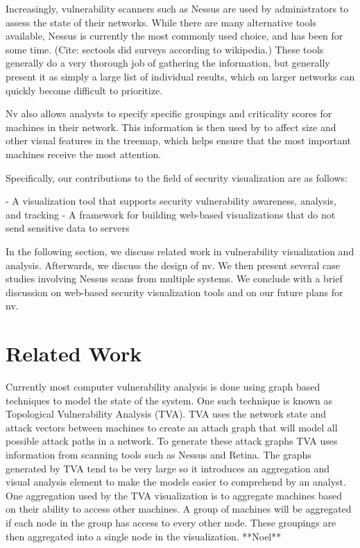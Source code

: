 \documentclass{acm_proc_article-sp}
\begin{document}
Increasingly, vulnerability scanners such as Nessus are used by administrators to assess the state of their networks.  While there are many alternative tools available, Nessus is currently the most commonly used choice, and has been for some time. (Cite: sectools did surveys according to wikipedia.)  These tools generally do a very thorough job of gathering the information, but generally present it as simply a large list of individual results, which on larger networks can quickly become difficult to prioritize.

Nv also allows analysts to specify specific groupings and criticality scores for machines in their network. 
This information is then used by to affect size and other visual features in the treemap, which helps ensure that the most important machines receive the most attention.

Specifically, our contributions to the field of security visualization are as follows:

- A visualization tool that supports security vulnerability awareness, analysis, and tracking
- A framework for building web-based visualizations that do not send sensitive data to servers

In the following section, we discuss related work in vulnerability visualization and analysis. 
Afterwards, we discuss the design of nv. 
We then present several case studies involving Nessus scans from multiple systems. 
We conclude with a brief discussion on web-based security visualization tools and on our future plans for nv.

\section{Related Work}
Currently most computer vulnerability analysis is done using graph based
techniques to model the state of the system.
One such technique is known as
Topological Vulnerability Analysis (TVA).
TVA uses the network state and attack
vectors between machines to create an attach graph that will model all possible attack paths in a
network.
 To generate these attack graphs TVA uses information from scanning
tools such as Nessus and Retina.
 The graphs generated by TVA tend to be very
large so it introduces an aggregation and visual analysis element to make the
models easier to comprehend by an analyst.
 One aggregation used by the TVA
visualization is to
aggregate machines based on their ability to access other machines.
 A group of
machines will be aggregated if each node in the group has access to every other
node.
These groupings are then aggregated into a single node in the visualization.
**Noel**
\end{document}
